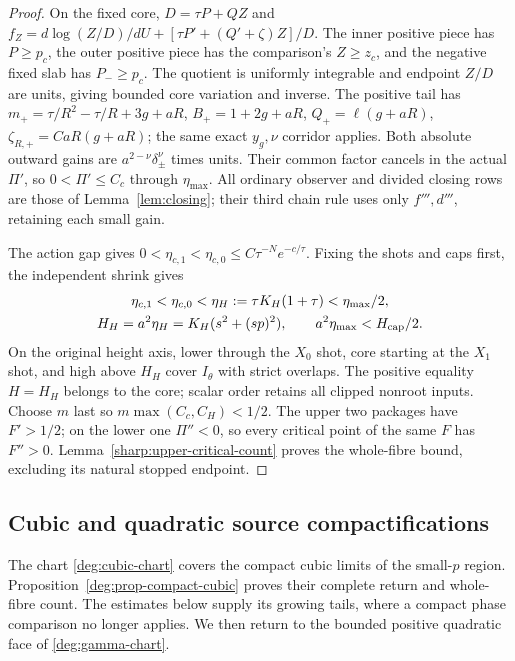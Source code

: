 \begin{proof}
On the fixed core, \(D=\tau P+QZ\) and
\(f_Z=d\log(Z/D)/dU+[\tau P'+(Q'+\zeta)Z]/D\).
The inner positive piece has \(P\ge p_c\), the outer positive piece
has the comparison's \(Z\ge z_c\), and the negative fixed slab has
\(P_-\ge p_c\). The quotient is uniformly integrable and endpoint
\(Z/D\) are units, giving bounded core variation and inverse.
The positive tail has \(m_+=\tau/R^2-\tau/R+3g+aR\),
\(B_+=1+2g+aR\), \(Q_+=\ell(g+aR)\),
\(\zeta_{R,+}=CaR(g+aR)\); the same exact \(y_g,\nu\) corridor
applies. Both absolute outward gains are
\(a^{2-\nu}\delta_\pm^\nu\) times units. Their common factor cancels
in the actual \(\Pi'\), so \(0<\Pi'\le C_c\) through
\(\eta_{\max}\). All ordinary observer and divided closing rows are
those of Lemma~\ref{lem:closing}; their third chain rule uses only
\(f''',d'''\), retaining each small gain.

The action gap gives
\(0<\eta_{c,1}<\eta_{c,0}\le C\tau^{-N}e^{-c/\tau}\).
Fixing the shots and caps first, the independent shrink gives
\begin{equation}\label{deg:far-physical-cover}
 \begin{gathered}
 \eta_{c,1}<\eta_{c,0}<\eta_H:=\tau K_H(1+\tau)<\eta_{\max}/2,\\
 H_H=a^2\eta_H=K_H(s^2+(sp)^2),\qquad a^2\eta_{\max}<H_{\rm cap}/2.
 \end{gathered}
\end{equation}
On the original height axis, lower through the \(X_0\) shot, core
starting at the \(X_1\) shot, and high above \(H_H\) cover \(I_\theta\)
with strict overlaps. The positive equality \(H=H_H\) belongs to the
core; scalar order retains all clipped nonroot inputs. Choose \(m\)
last so \(m\max(C_c,C_H)<1/2\). The upper two packages have
\(F'>1/2\); on the lower one \(\Pi''<0\), so every critical point
of the same \(F\) has \(F''>0\). Lemma~\ref{sharp:upper-critical-count}
proves the whole-fibre bound, excluding its natural stopped endpoint.
\end{proof}

\subsection{Cubic and quadratic source compactifications}
\label{subsec:deg-cubic-quadratic}

The chart \eqref{deg:cubic-chart} covers the compact cubic limits of
the small-\(p\) region. Proposition~\ref{deg:prop-compact-cubic}
proves their complete return and whole-fibre count. The estimates below
supply its growing tails, where a compact phase comparison no longer
applies. We then return to the bounded positive quadratic face of
\eqref{deg:gamma-chart}.

